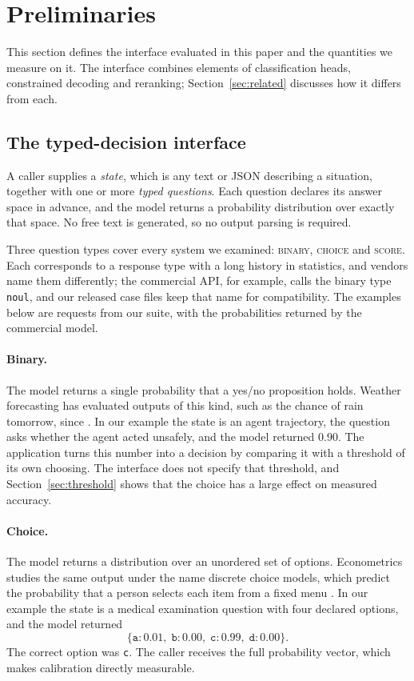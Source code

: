 \section{Preliminaries}
\label{sec:typed}

This section defines the interface evaluated in this paper and the quantities we
measure on it. The interface combines elements of classification heads,
constrained decoding and reranking; Section~\ref{sec:related} discusses how it
differs from each.

\subsection{The typed-decision interface}

A caller supplies a \emph{state}, which is any text or JSON describing a
situation, together with one or more \emph{typed questions}. Each question
declares its answer space in advance, and the model returns a probability
distribution over exactly that space. No free text is generated, so no output
parsing is required.

Three question types cover every system we examined: \textsc{binary},
\textsc{choice} and \textsc{score}. Each corresponds to a response type with a
long history in statistics, and vendors name them differently; the commercial API,
for example, calls the binary type \texttt{noul}, and our released case files keep
that name for compatibility. The examples below are requests from our suite, with
the probabilities returned by the commercial model.

\paragraph{Binary.} The model returns a single probability that a yes/no
proposition holds. Weather forecasting has evaluated outputs of this kind, such as
the chance of rain tomorrow, since \citet{brier1950}. In our example the state is an agent
trajectory, the question asks whether the agent acted unsafely, and the model
returned $0.90$. The application turns this number into a decision by comparing
it with a threshold of its own choosing. The interface does not specify that
threshold, and Section~\ref{sec:threshold} shows that the choice has a large
effect on measured accuracy.

\paragraph{Choice.} The model returns a distribution over an unordered set of
options. Econometrics studies the same output under the name discrete choice
models, which predict the probability that a person selects each item from a
fixed menu \citep{mcfadden1974conditional}. In our example the state is a medical
examination question with four declared options, and the model returned
\[
  \{\texttt{a}: 0.01,\; \texttt{b}: 0.00,\; \texttt{c}: 0.99,\; \texttt{d}: 0.00\}.
\]
The correct option was \texttt{c}. The caller receives the full probability
vector, which makes calibration directly measurable.

